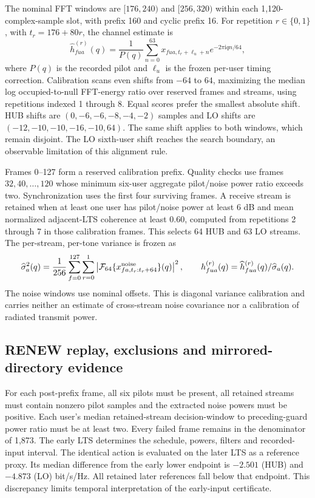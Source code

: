 \documentclass[10pt,letterpaper]{article}
\begin{document}
The nominal FFT windows are $[176,240)$ and $[256,320)$ within each
1,120-complex-sample slot, with prefix 160 and cyclic prefix 16.
For repetition $r\in\{0,1\}$, with $t_r=176+80r$, the channel estimate is
\begin{equation}
 \widehat h^{(r)}_{fua}(q)=\frac{1}{P(q)}
 \sum_{n=0}^{63}x_{fua,t_r+\ell_u+n}e^{-2\pi\mathrm{i}qn/64},
 \label{supp:eq_renew_fft}
\end{equation}
where $P(q)$ is the recorded pilot and $\ell_u$ is the frozen per-user timing
correction. Calibration scans even shifts from $-64$ to $64$, maximizing
the median log occupied-to-null FFT-energy ratio over reserved frames and
streams, using repetitions indexed 1 through 8. Equal scores prefer the
smallest absolute shift. HUB shifts are $(0,-6,-6,-8,-4,-2)$ samples and LO
shifts are $(-12,-10,-10,-16,-10,64)$. The same shift applies to both windows,
which remain disjoint. The LO sixth-user shift reaches the search boundary,
an observable limitation of this alignment rule.

Frames 0--127 form a reserved calibration prefix. Quality checks use frames
$32,40,\ldots,120$ whose minimum six-user aggregate pilot/noise power ratio
exceeds two. Synchronization uses the first four surviving frames. A receive
stream is retained when at least one user has pilot/noise power at least
6 dB and mean normalized adjacent-LTS coherence at least 0.60, computed
from repetitions 2 through 7 in those calibration frames. This selects
64 HUB and 63 LO streams. The per-stream, per-tone variance is frozen as
\begin{equation}
 \widehat\sigma_a^2(q)=\frac{1}{256}\sum_{f=0}^{127}\sum_{r=0}^{1}
 \left|\mathcal F_{64}\{x^{\rm noise}_{fa,t_r:t_r+64}\}(q)\right|^2,
 \qquad h^{(r)}_{fua}(q)=\widehat h^{(r)}_{fua}(q)/\widehat\sigma_a(q).
\end{equation}
The noise windows use nominal offsets. This is diagonal variance calibration
and carries neither an estimate of cross-stream noise covariance nor a
calibration of radiated transmit power.

\clearpage
\subsection*{RENEW replay, exclusions and mirrored-directory evidence}
For each post-prefix frame, all six pilots must be present, all retained
streams must contain nonzero pilot samples and the extracted noise powers
must be positive. Each user's median retained-stream decision-window to
preceding-guard power ratio must be at least two. Every failed frame remains
in the denominator of 1,873. The early LTS determines the schedule, powers,
filters and recorded-input interval. The identical action is evaluated on
the later LTS as a reference proxy. Its median difference from the early
lower endpoint is $-2.501$ (HUB) and $-4.873$ (LO) bit/s/Hz. All retained
later references fall below that endpoint. This discrepancy limits temporal
interpretation of the early-input certificate.
\end{document}
